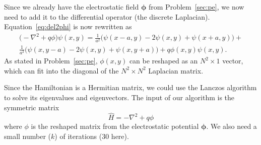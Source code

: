 \Answer{}
Since we already have the electrostatic field \(\bm{\phi}\) from Problem~\ref{sec:pe},
we now need to add it to the differential operator (the discrete Laplacian).
Equation~\eqref{eq:del2phi} is now rewritten as
%
\begin{multline}\label{eq:del2psi}
    \bigl(-\nabla^2 + q \phi\bigr) \psi(x, y) =
    \frac{ 1 }{ a^2 } \bigl(\psi(x - a, y) - 2 \psi(x, y) + \psi(x + a, y)\bigr) +\\
    \frac{ 1 }{ a^2 } \bigl(\psi(x, y - a) - 2 \psi(x, y) + \psi(x, y + a)\bigr) +
    q \phi(x, y) \psi(x, y).
\end{multline}
%
As stated in Problem~\ref{sec:pe},
\(\phi(x, y)\) can be reshaped as an \(N^2 \times 1\) vector,
which can fit into the diagonal of the \(N^2 \times N^2\) Laplacian matrix.

Since the Hamiltonian is a Hermitian matrix, we could use the Lanczos algorithm to
solve its eigenvalues and eigenvectors.
The input of our algorithm is the symmetric matrix
%
\begin{equation}\label{eq:hamiltonian}
    \hat{H} = -\nabla^2 + q \phi
\end{equation}
%
where \(\phi\) is the reshaped matrix from the electrostatic potential \(\bm{\phi}\).
We also need a small number (\(k\)) of iterations (\(30\) here).

